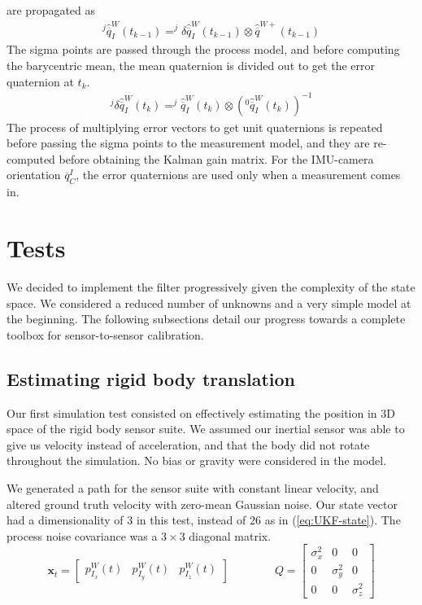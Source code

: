 \documentclass[letterpaper]{article}
\newcommand{\bb}[1]{\mathbf{#1}}
\begin{document}
are propagated as
\begin{align}
^j \hat{\overline{q}}_I^W(t_{k-1})=^j \delta \hat{\overline{q}}_I^W(t_{k-1}) \otimes \hat{\overline{q}}^{W+} (t_{k-1})
\end{align}
The sigma points are passed through the process model, and before
computing the barycentric mean, the mean quaternion is divided out to
get the error quaternion at $t_k$.
\begin{align}
^j \delta \hat{\overline{q}}_I^W(t_k)=^j \hat{\overline{q}}_I^W(t_k) \otimes \left( ^0 \hat{\overline{q}}_I^W(t_k)\right)^{-1}
\end{align}
The process of multiplying error vectors to get unit quaternions is
repeated before passing the sigma points to the measurement model, and
they are re-computed before obtaining the Kalman gain matrix. For the
IMU-camera orientation $\overline{q}_C^I$, the error quaternions are
used only when a measurement comes in.

\section{Tests}

We decided to implement the filter progressively given the complexity
of the state space. We considered a reduced number of unknowns and a
very simple model at the beginning. The following subsections detail
our progress towards a complete toolbox for sensor-to-sensor
calibration.

\subsection{Estimating rigid body translation}

Our first simulation test consisted on effectively estimating the
position in 3D space of the rigid body sensor suite. We assumed our
inertial sensor was able to give us velocity instead of acceleration,
and that the body did not rotate throughout the simulation. No bias
or gravity were considered in the model.

We generated a path for the sensor suite with constant linear
velocity, and altered ground truth velocity with zero-mean Gaussian
noise. Our state vector had a dimensionality of $3$ in this test,
instead of $26$ as in (\ref{eq:UKF-state}). The process noise
covariance was a $3 \times 3$ diagonal matrix.
\begin{equation}
\bb{x}_t=\begin{bmatrix} p_{I_x}^W(t) & p_{I_y}^W(t) & p_{I_z}^W(t) \end{bmatrix} 
\hspace{4em}
Q = \begin{bmatrix} 
\sigma_x^2 & 0 & 0\\ 
0 & \sigma_y^2 & 0\\ 
0 & 0 & \sigma_z^2
\end{bmatrix} 
\label{eq:TranslationTest-stateVec}
\end{equation}
\end{document}
